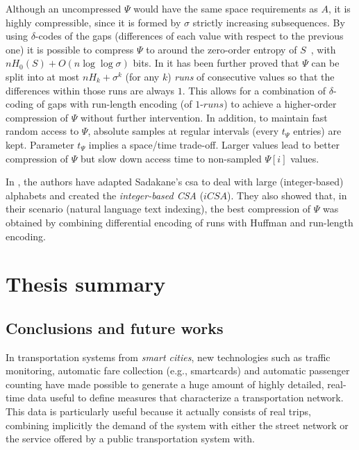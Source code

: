 \documentclass[a4paper,10pt,twoside]{book}
\begin{document}
    Although an uncompressed $\Psi$ would have the same space requirements
    as $A$, it is highly compressible, since it is formed by $\sigma$ strictly increasing subsequences. By using $\delta$-codes of the gaps (differences of each value with respect to the previous one) it is possible to compress $\Psi$ to around the zero-order entropy of $S$~\cite{Sad03}, with $nH_0(S)+O(n\log\log\sigma)$ bits.
    In \cite{NM07} it has been further proved that $\Psi$ can be split into
    at most $nH_k+\sigma^k$ (for any $k$) {\em runs} of consecutive values so
    that the differences within those runs are always $1$. This allows for a combination of $\delta$-coding of gaps with run-length
    encoding (of $1$-$runs$) to achieve a higher-order compression of $\Psi$ without further intervention.
    In addition, to maintain fast random access to $\Psi$, absolute
    samples at regular intervals (every $t_{\Psi}$ entries) are kept. Parameter
    $t_{\Psi}$ implies a space/time trade-off. Larger values lead to better compression of $\Psi$ but slow down access time to non-sampled $\Psi[i]$ values.
    
    In \cite{FBNCPR12}, the authors have adapted Sadakane's \gls{csa} to deal with large (integer-based) alphabets
    and created the {\em integer-based CSA} ($iCSA$). They also showed that, in their scenario (natural language text indexing), the best
    compression of $\Psi$ was obtained by combining differential encoding of runs with Huffman and
    run-length encoding.

%

%

\part{Thesis summary} \label{part:final}
\chapter{Conclusions and future works}
\label{ch:concl}
	In transportation systems from \textit{smart cities}, new technologies such as traffic monitoring, automatic fare collection (e.g., smartcards) and automatic passenger counting have made possible to generate a huge amount of highly detailed,
	real-time data useful to define measures that characterize  a transportation network. This data is particularly useful because it actually consists of real trips, combining implicitly the demand of the system with either the street network or the service offered by a public transportation system with.
	
\end{document}
